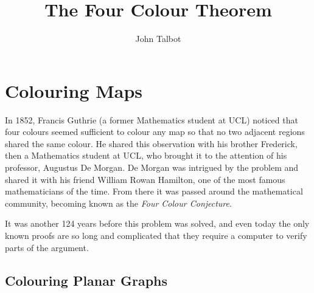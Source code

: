 \documentclass[12pt]{article}
\title{The Four Colour Theorem}
\author{John Talbot}
\begin{document}
\maketitle

\section*{Colouring Maps}
In 1852, Francis Guthrie  (a former Mathematics student at UCL) noticed that four colours seemed sufficient to colour any map so that no two adjacent regions shared the same colour. He shared this observation with his brother Frederick, then a Mathematics student at UCL, who brought it to the attention of his professor, Augustus De Morgan. De Morgan was intrigued by the problem and shared it with his friend William Rowan Hamilton, one of the most famous mathematicians of the time. From there it was passed around the mathematical community, becoming known as the \emph{Four Colour Conjecture}.

It was another 124 years before this problem was solved, and even today the only known proofs are so long and complicated that they require a computer to verify parts of the argument.

\subsection*{Colouring Planar Graphs}
\end{document}
